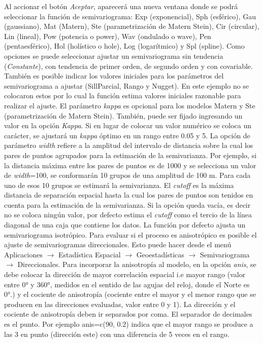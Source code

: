 \documentclass[11pt,b5paper,]{krantz}
\begin{document}
Al accionar el botón \emph{Aceptar}, aparecerá una nueva ventana donde se podrá seleccionar la función de semivariograma: Exp (exponencial), Sph (esférico), Gau (gaussiano), Mat (Matern), Ste (parametrización de Matern Stein), Cir (circular), Lin (lineal), Pow (potencia o power), Wav (ondulado o wave), Pen (pentaesférico), Hol (holístico o hole), Log (logarítmico) y Spl (spline). Como opciones se puede seleccionar ajustar un semivariograma sin tendencia (\emph{Constante}), con tendencia de primer orden, de segundo orden y con covariable. También es posible indicar los valores iniciales para los parámetros del semivariograma a ajustar (SillParcial, Rango y Nugget). En este ejemplo no se colocaron estos por lo cual la función estima valores iniciales razonable para realizar el ajuste. El parámetro \emph{kappa} es opcional para los modelos Matern y Ste (parametrización de Matern Stein). También, puede ser fijado ingresando un valor en la opción \emph{Kappa}. Si en lugar de colocar un valor numérico se coloca un carácter, se ajustará un \emph{kappa} óptimo en un rango entre 0.05 y 5. La opción de parámetro \emph{width} refiere a la amplitud del intervalo de distancia sobre la cual los pares de puntos agrupados para la estimación de la semivarianza. Por ejemplo, si la distancia máxima entre los pares de puntos es de 1000 y se selecciona un valor de \emph{width}=100, se conformarán 10 grupos de una amplitud de 100 m. Para cada uno de esos 10 grupos se estimará la semivarianza. El \emph{cutoff} es la máxima distancia de separación espacial hasta la cual los pares de puntos son tenidos en cuenta para la estimación de la semivarianza. Si la opción queda vacía, es decir no se coloca ningún valor, por defecto estima el \emph{cutoff} como el tercio de la línea diagonal de una caja que contiene los datos. La función por defecto ajusta un semivariograma isotrópico. Para evaluar si el proceso es anisotrópico es posible el ajuste de semivariogramas direccionales. Esto puede hacer desde el menú Aplicaciones \(\to\) Estadística Espacial \(\to\) Geoestadísticas \(\to\) Semivariograma \(\to\) Direccionales. Para incorporar la anisotropía al modelo, en la opción \emph{anis}, se debe colocar la dirección de mayor correlación espacial i.e mayor rango (valor entre 0° y 360°, medidos en el sentido de las agujas del reloj, donde el Norte es 0°.) y el cociente de anisotropía (cociente entre el mayor y el menor rango que se producen en las direcciones evaluadas, valor entre 0 y 1). La dirección y el cociente de anisotropía deben ir separados por coma. El separador de decimales es el punto. Por ejemplo anis=c(90, 0.2) indica que el mayor rango se produce a las 3 en punto (dirección este) con una diferencia de 5 veces en el rango.
\end{document}
